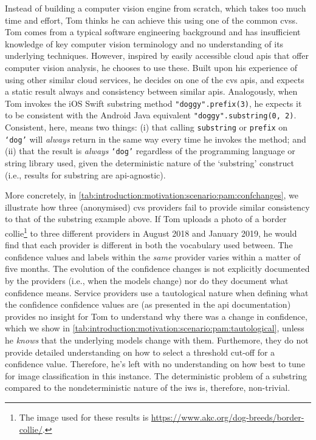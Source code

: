 Instead of building a computer vision engine from scratch, which takes too much time and effort, Tom thinks he can achieve this using one of the common \glspl{cvs}. Tom comes from a typical software engineering background and has insufficient knowledge of key computer vision terminology and no understanding of its underlying techniques. However, inspired by easily accessible cloud \glspl{api} that offer computer vision analysis, he chooses to use these. Built upon his experience of using other similar cloud services, he decides on one of the \gls{cvs} \glspl{api}, and expects a static result always and consistency between similar \glspl{api}. Analogously, when Tom invokes the iOS Swift substring method \texttt{"doggy".prefix(3)}, he expects it to be consistent with the Android Java equivalent \texttt{"doggy".substring(0, 2)}. Consistent, here, means two things: (i) that calling \texttt{substring} or \texttt{prefix} on \texttt{`dog'} will \textit{always} return in the same way every time he invokes the method; and (ii) that the result is \textit{always} \texttt{`dog'} regardless of the programming language or string library used, given the deterministic nature of the `substring' construct (i.e., results for substring are \gls{api}-agnostic). 



More concretely, in \cref{tab:introduction:motivation:scenario:pam:confchanges}, we illustrate how three (anonymised) \gls{cvs} providers fail to provide similar consistency to that of the substring example above. If Tom uploads a photo of a border collie\footnote{The image used for these results is \url{https://www.akc.org/dog-breeds/border-collie/}.} to three different providers in August 2018 and January 2019, he would find that each provider is different in both the vocabulary used between. The confidence values and labels within the \textit{same} provider varies within a matter of five months. The evolution of the confidence changes is not explicitly documented by the providers (i.e., when the models change) nor do they document what confidence means. Service providers use a tautological nature when defining what the confidence confidence values are (as presented in the \gls{api} documentation) provides no insight for Tom to understand why there was a change in confidence, which we show in \cref{tab:introduction:motivation:scenario:pam:tautological}, unless he \textit{knows} that the underlying models change with them. Furthemore, they do not provide detailed understanding on how to select a threshold cut-off for a confidence value. Therefore, he's left with no understanding on how best to tune for image classification in this instance. The deterministic problem of a substring compared to the nondeterministic nature of the \gls{iws} is, therefore, non-trivial.

